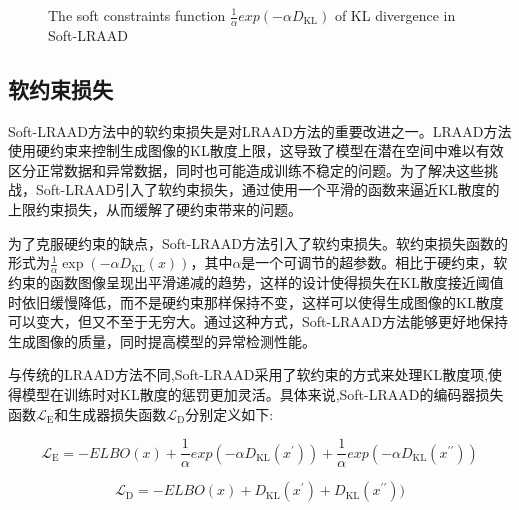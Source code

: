 \documentclass{article}
\begin{document}
\begin{figure}[H]
  \begin{minipage}{0.45\textwidth}
    \centering
    \def\svgwidth{\textwidth}
    
    \caption{The hard constraints function $[M - D_{\mathrm{KL}}]^{+}$ of KL divergence in LRAAD}
    \label{fig:hard_constraints}
  \end{minipage}
  \hfill
  \begin{minipage}{0.45\textwidth}
    \centering
    \def\svgwidth{\textwidth}
    
    \caption{The soft constraints function $\frac{1}{\alpha}exp(- \alpha D_{\mathrm{KL}})$ of KL divergence in Soft-LRAAD}
    \label{fig:soft_constraints}
  \end{minipage}
\end{figure}

\subsection{软约束损失}

Soft-LRAAD方法中的软约束损失是对LRAAD方法的重要改进之一。LRAAD方法使用硬约束来控制生成图像的KL散度上限，这导致了模型在潜在空间中难以有效区分正常数据和异常数据，同时也可能造成训练不稳定的问题。为了解决这些挑战，Soft-LRAAD引入了软约束损失，通过使用一个平滑的函数来逼近KL散度的上限约束损失，从而缓解了硬约束带来的问题。

为了克服硬约束的缺点，Soft-LRAAD方法引入了软约束损失。软约束损失函数的形式为$\frac{1}{\alpha}\exp(- \alpha D_{\mathrm{KL}}(x))$，其中$\alpha$是一个可调节的超参数。相比于硬约束，软约束的函数图像呈现出平滑递减的趋势，这样的设计使得损失在KL散度接近阈值时依旧缓慢降低，而不是硬约束那样保持不变，这样可以使得生成图像的KL散度可以变大，但又不至于无穷大。通过这种方式，Soft-LRAAD方法能够更好地保持生成图像的质量，同时提高模型的异常检测性能。

与传统的LRAAD方法不同,Soft-LRAAD采用了软约束的方式来处理KL散度项,使得模型在训练时对KL散度的惩罚更加灵活。具体来说,Soft-LRAAD的编码器损失函数$\mathcal{L}_{\mathrm{E}}$和生成器损失函数$\mathcal{L}_{\mathrm{D}}$分别定义如下:

\begin{equation}
  \mathcal{L}_{\mathrm{E}}=-ELBO(x) + \frac{1}{\alpha}exp(- \alpha D_{\mathrm{KL}}(x^\prime)) + \frac{1}{\alpha}exp(-\alpha D_{\mathrm{KL}}(x^{\prime\prime}))
\end{equation}

\begin{equation}
  \mathcal{L}_{\text {D}}=-ELBO(x) + D_\mathrm{KL}(x^\prime) + D_\mathrm{KL}(x^{\prime\prime}))
\end{equation}
\end{document}
